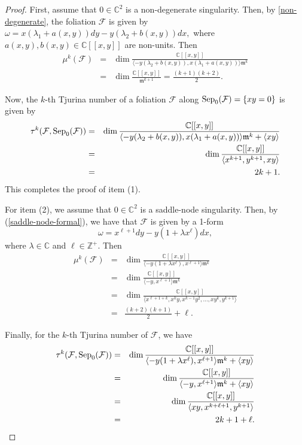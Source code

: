 \documentclass[10pt,a4paper]{amsart}
\newcommand{\C}{\mathbb{C}}
\newcommand{\F}{\mathcal{F}}
\newcommand{\m}{\mathfrak{m}}
\newcommand{\sep}{\mbox{\rm Sep}}
\begin{document}
\begin{proof}
First, assume that $0 \in \C^2$ is a non-degenerate singularity. Then, by \ref{non-degenerate}, the foliation $\mathcal{F}$ is given by
$\omega = x(\lambda_1 + a(x,y))dy - y(\lambda_2 + b(x,y))dx,$
where $a(x,y), b(x,y) \in {\mathbb C}[[x,y]]$ are non-units.
Then
\begin{eqnarray*}
\mu^{k}(\mathcal{F}) &=& \dim \frac{\C[[x,y]]}{ \langle-y(\lambda_2 + b(x,y)), x(\lambda_1 + a(x,y))\rangle\m^{k}}\\
&=& \dim  \frac{\C[[x,y]]}{\m^{k+1}}= \frac{(k+1)(k+2)}{2}.
\end{eqnarray*}


Now, the $k$-th Tjurina number of a foliation $\mathcal{F}$ along $\sep_0(\F) = \{xy = 0\}$ is given by
\begin{eqnarray*}
\tau^{k}(\mathcal{F},\sep_0(\F)) &=& \dim \frac{\C[[x,y]]}{ \langle-y(\lambda_2 + b(x,y)), x(\lambda_1 + a(x,y))\rangle\m^{k} + \langle xy\rangle}\\
&=& \dim\frac{\C[[x,y]]}{\langle x^{k+1}, y^{k+1}, xy\rangle}\\
&=& 2k + 1.
\end{eqnarray*}
 This completes the proof of item (1).

\par For item (2), we assume that $0 \in \C^2$ is a saddle-node singularity. Then, by (\ref{saddle-node-formal}), we have that $\F$ is given by a 1-form
\begin{equation*}
\omega = x^{\ell+1} dy - y(1 + \lambda x^{\ell})dx,
\end{equation*}
where $\lambda \in \mathbb{C}$ and $\ell \in \mathbb{Z}^{+}$. Then
\begin{eqnarray*}
\mu^{k}(\mathcal{F})&=& \dim\frac{\C[[x,y]]}{\langle -y(1 + \lambda x^{\ell}), x^{\ell+1}\rangle \m^{k}}\\
&=& \dim\frac{\C[[x,y]]}{\langle -y, x^{\ell+1}\rangle\m^k}\\
&=& \dim\frac{\C[[x,y]]}{\langle x^{\ell+1+k}, x^{k}y, x^{k-1}y^{2}, \ldots, xy^{k}, y^{k+1}\rangle}\\
&=& \frac{(k+2)(k+1)}{2} + \ell.
\end{eqnarray*}

Finally, for the $k$-th Tjurina number of $\F$, we have
\begin{eqnarray*}
\tau^{k}(\mathcal{F}, \sep_0(\F)) &=& \dim\frac{\C[[x,y]]}{\langle -y(1 + \lambda x^{\ell}), x^{\ell+1}\rangle\m^{k} + \langle xy\rangle}\\
&=& \dim\frac{\C[[x,y]]}{\langle -y, x^{\ell+1}\rangle \m^{k} + \langle xy\rangle}\\
&=& \dim\frac{\C[[x,y]]}{\langle xy, x^{k+\ell+1}, y^{k+1}\rangle}\\
&=& 2k + 1 + \ell.
\end{eqnarray*}
\end{proof}
\end{document}

